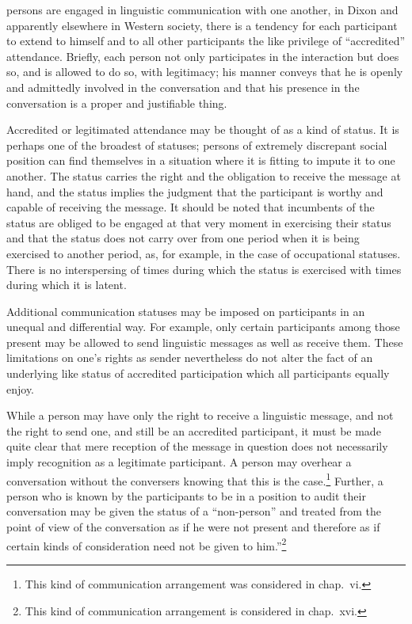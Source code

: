 \documentclass[twoside,symmetric,nobib,justified]{tufte-book}
\begin{document}
 persons are engaged in linguistic communication with
one another, in Dixon and apparently elsewhere in Western society, there
is a tendency for each participant to extend to himself and to all other
participants the like privilege of ``accredited'' attendance. Briefly,
each person not only participates in the interaction but does so, and is
allowed to do so, with legitimacy; his manner conveys that he is openly
and admittedly involved in the conversation and that his presence in the
conversation is a proper and justifiable thing.

Accredited or legitimated attendance may be thought of as a kind of
status. It is perhaps one of the broadest of statuses; persons of
extremely discrepant social position can find themselves in a situation
where it is fitting to impute it to one another. The status carries the
right and the obligation to receive the message at hand, and the status
implies the judgment that the participant is worthy and capable of
receiving the message. It should be noted that incumbents of the status
are obliged to be engaged at that very moment in exercising their status
and that the status does not carry over from one period when it is being
exercised to another period, as, for example, in the case of
occupational statuses. There is no interspersing of times during which
the status is exercised with times during which it is latent.

Additional communication statuses may be imposed on participants in an
unequal and differential way. For example, only certain participants
among those present may be allowed to send linguistic messages as well
as receive them. These limitations on one's rights as sender
nevertheless do not alter the fact of an underlying like status of
accredited participation which all participants equally enjoy.

While a person may have only the right to receive a linguistic message,
and not the right to send one, and still be an accredited participant,
it must be made quite clear that mere reception of the message in
question does not necessarily imply recognition as a legitimate
participant. A person may overhear a conversation without the conversers
knowing that this is the case.\footnote{This kind of communication
  arrangement was considered in chap.~vi.} Further, a person who is
known by the participants to be in a position to audit their
conversation may be given the status of a ``non-person'' and treated
from the point of view of the conversation as if he were not present and
therefore as if certain kinds of consideration need not be given to
him.''\footnote{This kind of communication arrangement is considered in
  chap.~xvi.}
\end{document}
